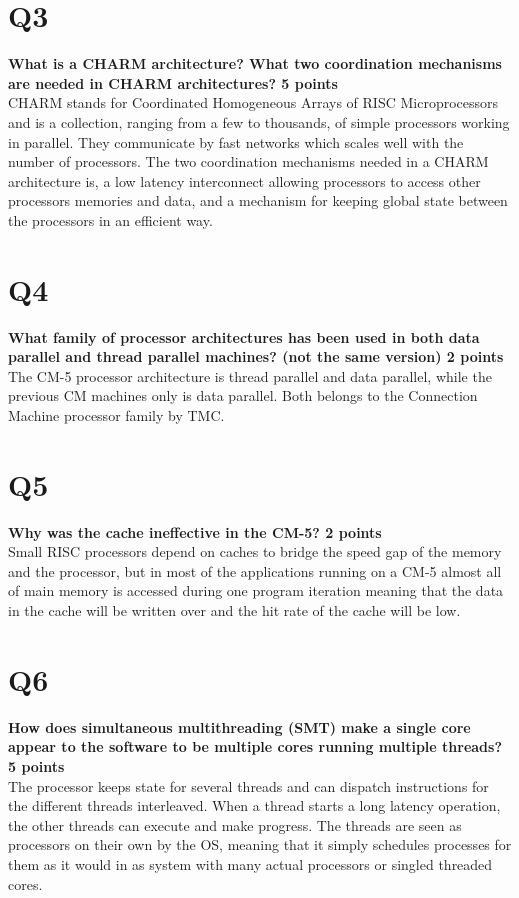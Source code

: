 \documentclass[a4paper]{article}
\begin{document}
\section*{Q3}
\large{\textbf{
What is a CHARM architecture? What two coordination mechanisms are needed in CHARM architectures? 5 points\\}}
CHARM stands for Coordinated Homogeneous Arrays of RISC Microprocessors and is a collection, ranging from a few to thousands, of simple processors working in parallel. They communicate by fast networks which scales well with the number of processors.  The two coordination mechanisms needed in a CHARM architecture is, a low latency interconnect allowing processors to access other processors memories and data, and a mechanism for keeping global state between the processors in an efficient way. 

\section*{Q4}
\large{\textbf{
What family of processor architectures has been used in both data parallel and thread parallel machines? (not the same version) 2 points\\}}
The CM-5 processor architecture is thread parallel and data parallel, while the previous CM machines only is data parallel. Both belongs to the Connection Machine processor family by TMC.

\section*{Q5}
\large{\textbf{
Why was the cache ineffective in the CM-5? 2 points\\}}
Small RISC processors depend on caches to bridge the speed gap of the memory and the processor, but in most of the applications running on a CM-5 almost all of main memory is accessed during one program iteration meaning that the  data in the cache will be written over and the hit rate of the cache will be low. 

\section*{Q6}
\large{\textbf{
How does simultaneous multithreading (SMT) make a single core appear to the software to be multiple cores running multiple threads? 5 points\\}}
The processor keeps state for several threads and can dispatch instructions for the different threads interleaved. When a thread starts a long latency operation, the other threads can execute and make progress. The threads are seen as processors on their own by the OS, meaning that it simply schedules processes for them as it would in as system with many actual processors or singled threaded cores.
\end{document}
